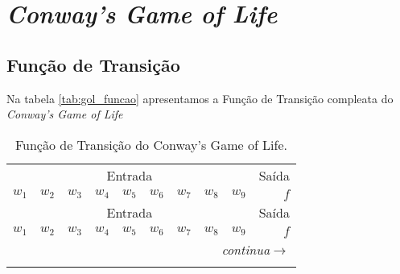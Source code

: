 \clearpage
\section{\textit{Conway's Game of Life}}
\label{apsec:reslts_gol}

\subsection{Função de Transição}
Na tabela \ref{tab:gol_funcao} apresentamos a Função de Transição compleata do \textit{Conway's Game of Life}

\begin{longtable}[c]{rrrrrrrrrr}

\toprule
\multicolumn{9}{c}{Entrada} &
\multicolumn{1}{c}{Saída} \\

\cmidrule(lr){1-9} \cmidrule(lr){10-10}
{$w_1$} &  {$w_2$} &  {$w_3$} &  {$w_4$} &  {$w_5$} &  {$w_6$} &  {$w_7$} &  {$w_8$} & {$w_9$} & 
{$f$} \\
\cmidrule(lr){1-9} \cmidrule(lr){10-10}


\endfirsthead %

\toprule
\multicolumn{9}{c}{Entrada} &
\multicolumn{1}{c}{Saída} \\

\cmidrule(lr){1-9} \cmidrule(lr){10-10}
{$w_1$} &  {$w_2$} &  {$w_3$} &  {$w_4$} &  {$w_5$} &  {$w_6$} &  {$w_7$} &  {$w_8$} & {$w_9$} & 
{$f$} \\
\cmidrule(lr){1-9} \cmidrule(lr){10-10}


\endhead %


\multicolumn{10}{r}{\textit{continua}\enspace$\longrightarrow$}\\

\caption[]{Função de Transição do Conway's Game of Life.}

\endfoot %



\end{longtable}
